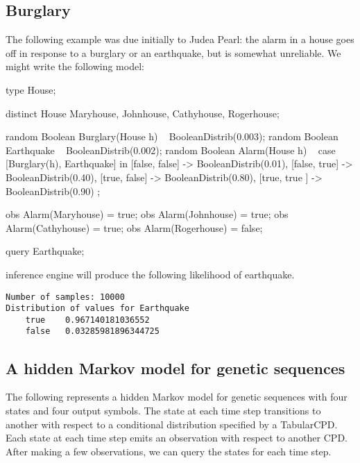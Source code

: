 \subsection{Burglary}
The following example was due initially to Judea Pearl:
the alarm in a house goes off in response to a burglary or an earthquake,
but is somewhat unreliable. We might write the following model:
\begin{blogcode}
type House;

distinct House Maryhouse, Johnhouse, Cathyhouse, Rogerhouse;

random Boolean Burglary(House h) ~ BooleanDistrib(0.003);
random Boolean Earthquake ~ BooleanDistrib(0.002);
random Boolean Alarm(House h) ~ 
  case [Burglary(h), Earthquake] in {
    [false, false] -> BooleanDistrib(0.01),
    [false, true]  -> BooleanDistrib(0.40),
    [true, false]  -> BooleanDistrib(0.80),
    [true, true ]  -> BooleanDistrib(0.90)
  };

obs Alarm(Maryhouse) = true;
obs Alarm(Johnhouse) = true;
obs Alarm(Cathyhouse) = true;
obs Alarm(Rogerhouse) = false;

query Earthquake;
\end{blogcode}

\bl inference engine will produce the following likelihood of earthquake.
\begin{verbatim}
Number of samples: 10000
Distribution of values for Earthquake
	true	0.967140181036552
	false	0.03285981896344725
\end{verbatim}


\subsection{A hidden Markov model for genetic sequences}
\begin{example}
The following represents a hidden Markov model for genetic sequences with four states and four output symbols. The state at each time step transitions to another with respect to a conditional distribution specified by a TabularCPD. 
Each state at each time step emits an observation with respect to another CPD. After making a few observations, we can query the states for each time step.
\end{example}

